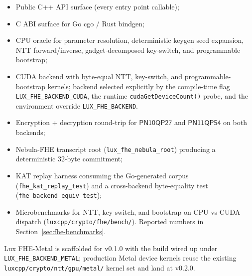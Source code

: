 \begin{itemize}
\item Public C++ API surface (every entry point callable);
\item C ABI surface for Go cgo / Rust bindgen;
\item CPU oracle for parameter resolution, deterministic keygen seed
expansion, NTT forward/inverse, gadget-decomposed key-switch, and
programmable bootstrap;
\item CUDA backend with byte-equal NTT, key-switch, and
programmable-bootstrap kernels; backend selected explicitly by the
compile-time flag \texttt{LUX\_FHE\_BACKEND\_CUDA}, the runtime
\texttt{cudaGetDeviceCount()} probe, and the environment override
\texttt{LUX\_FHE\_BACKEND}.
\item Encryption + decryption round-trip for $\mathsf{PN10QP27}$ and
$\mathsf{PN11QP54}$ on both backends;
\item Nebula-FHE transcript root (\texttt{lux\_fhe\_nebula\_root})
producing a deterministic 32-byte commitment;
\item KAT replay harness consuming the Go-generated corpus
(\texttt{fhe\_kat\_replay\_test}) and a cross-backend byte-equality
test (\texttt{fhe\_backend\_equiv\_test});
\item Microbenchmarks for NTT, key-switch, and bootstrap on CPU vs
CUDA dispatch (\texttt{luxcpp/crypto/fhe/bench/}). Reported numbers
in Section~\ref{sec:fhe-benchmarks}.
\end{itemize}

Lux FHE-Metal is scaffolded for v0.1.0 with the build wired up under
\texttt{LUX\_FHE\_BACKEND\_METAL}; production Metal device kernels reuse
the existing \texttt{luxcpp/crypto/ntt/gpu/metal/} kernel set and land
at v0.2.0.
